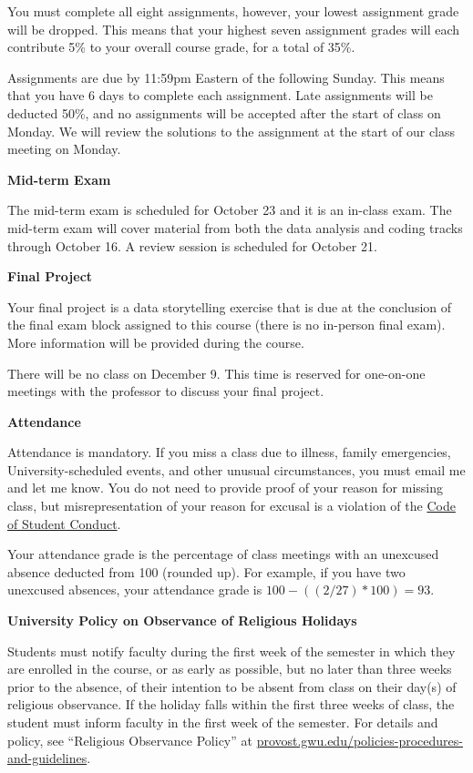 \documentclass[12pt,letterpaper]{article}
\begin{document}
You must complete all eight assignments, however, your lowest assignment grade will be dropped. This means that your highest seven assignment grades will each contribute 5\% to your overall course grade, for a total of 35\%. \par

Assignments are due by 11:59pm Eastern of the following Sunday. This means that you have 6 days to complete each assignment. Late assignments will be deducted 50\%, and no assignments will be accepted after the start of class on Monday. We will review the solutions to the assignment at the start of our class meeting on Monday. \par

\textbf{Mid-term Exam}

The mid-term exam is scheduled for October 23 and it is an in-class exam. The mid-term exam will cover material from both the data analysis and coding tracks through October 16. A review session is scheduled for October 21.

\textbf{Final Project}

Your final project is a data storytelling exercise that is due at the conclusion of the final exam block assigned to this course (there is no in-person final exam). More information will be provided during the course. \par

There will be no class on December 9. This time is reserved for one-on-one meetings with the professor to discuss your final project.

\textbf{Attendance}

Attendance is mandatory. If you miss a class due to illness, family emergencies, University-scheduled events, and other unusual circumstances, you must email me and let me know. You do not need to provide proof of your reason for missing class, but misrepresentation of your reason for excusal is a violation of the \href{https://studentconduct.gwu.edu/code-student-conduct}{Code of Student Conduct}. \par

Your attendance grade is the percentage of class meetings with an unexcused absence deducted from 100 (rounded up). For example, if you have two unexcused absences, your attendance grade is $100-((2/27)*100) = 93$. \par

\textbf{University Policy on Observance of Religious Holidays} \par

Students must notify faculty during the first week of the semester in which they are enrolled in the course, or as early as possible, but no later than three weeks prior to the absence, of their intention to be absent from class on their day(s) of religious observance. If the holiday falls within the first three weeks of class, the student must inform faculty in the first week of the semester. For details and policy, see ``Religious Observance Policy'' at \href{https://provost.gwu.edu/policies-procedures-and-guidelines}{provost.gwu.edu/policies-procedures-and-guidelines}.
\end{document}
